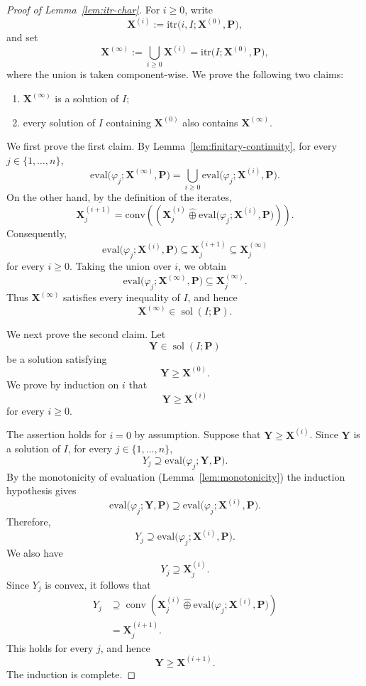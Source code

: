 \documentclass[10pt]{amsart}
\theoremstyle{plain}
\theoremstyle{definition}
\let\geq\geqslant
\providecommand{\cplus}[0]{\ensuremath{\hat{\oplus}}\xspace}
\providecommand{\conv}[1]{\ensuremath{\mathrm{conv}{\left({#1}\right)}\xspace}}
\providecommand{\evalmap}[0]{\ensuremath{\mathrm{eval}}\xspace}
\providecommand{\itr}[0]{\ensuremath{\mathrm{itr}}\xspace}
\begin{document}
\begin{proof}[Proof of Lemma~\ref{lem:itr-char}]

For \(i\geq 0\), write
\[
\mathbf X^{(i)}
:=
\itr
\bigl(i,I;\mathbf X^{(0)},\mathbf P\bigr),
\]
and set
\[
\mathbf X^{(\infty)}
:=
\bigcup_{i\geq 0}\mathbf X^{(i)}
=
\itr
\bigl(I;\mathbf X^{(0)},\mathbf P\bigr),
\]
where the union is taken component-wise. We prove the following two
claims:
\begin{enumerate}
\item
\(\mathbf X^{(\infty)}\) is a solution of \(I\);
\item
every solution of \(I\) containing \(\mathbf X^{(0)}\) also contains
\(\mathbf X^{(\infty)}\).
\end{enumerate}

We first prove the first claim. By Lemma~\ref{lem:finitary-continuity}, for every
\(j\in\{1,\ldots,n\}\),
\[
\evalmap
\bigl(
\varphi_j;\mathbf X^{(\infty)},\mathbf P
\bigr)
=
\bigcup_{i\geq 0}
\evalmap
\bigl(
\varphi_j;\mathbf X^{(i)},\mathbf P
\bigr).
\]
On the other hand, by the definition of the iterates,
\[
\mathbf X^{(i+1)}_j
=\conv{
\left(
\mathbf X^{(i)}_j
\mathbin{\cplus}
\evalmap
\bigl(
\varphi_j;\mathbf X^{(i)},\mathbf P
\bigr)
\right)}.
\]
Consequently,
\[
\evalmap
\bigl(
\varphi_j;\mathbf X^{(i)},\mathbf P
\bigr)
\subseteq
\mathbf X^{(i+1)}_j
\subseteq
\mathbf X^{(\infty)}_j
\]
for every \(i\geq 0\). Taking the union over \(i\), we obtain
\[
\evalmap
\bigl(
\varphi_j;\mathbf X^{(\infty)},\mathbf P
\bigr)
\subseteq
\mathbf X^{(\infty)}_j.
\]
Thus \(\mathbf X^{(\infty)}\) satisfies every inequality of \(I\), and
hence
\[
\mathbf X^{(\infty)}\in\operatorname{sol}(I;\mathbf P).
\]

We next prove the second claim. Let
\[
\mathbf Y\in\operatorname{sol}(I;\mathbf P)
\]
be a solution satisfying
\[
\mathbf Y\geq \mathbf X^{(0)}.
\]
We prove by induction on \(i\) that
\[
\mathbf Y\geq \mathbf X^{(i)}
\]
for every \(i\geq 0\).

The assertion holds for \(i=0\) by assumption. Suppose that
\(\mathbf Y\geq\mathbf X^{(i)}\). Since \(\mathbf Y\) is a solution of
\(I\), for every \(j\in\{1,\ldots,n\}\),
\[
Y_j
\supseteq
\evalmap
\bigl(
\varphi_j;\mathbf Y,\mathbf P
\bigr).
\]
By the monotonicity of evaluation (Lemma~\ref{lem:monotonicity}) the
induction hypothesis gives
\[
\evalmap
\bigl(
\varphi_j;\mathbf Y,\mathbf P
\bigr)
\supseteq
\evalmap
\bigl(
\varphi_j;\mathbf X^{(i)},\mathbf P
\bigr).
\]
Therefore,
\[
Y_j
\supseteq
\evalmap
\bigl(
\varphi_j;\mathbf X^{(i)},\mathbf P
\bigr).
\]
We also have
\[
Y_j\supseteq \mathbf X^{(i)}_j.
\]
Since \(Y_j\) is convex, it follows that
\[
\begin{aligned}
Y_j
&\supseteq
\operatorname{conv}
\left(
\mathbf X^{(i)}_j
\mathbin{\cplus}
\evalmap
\bigl(
\varphi_j;\mathbf X^{(i)},\mathbf P
\bigr)
\right) \\
&=
\mathbf X^{(i+1)}_j.
\end{aligned}
\]
This holds for every \(j\), and hence
\[
\mathbf Y\geq \mathbf X^{(i+1)}.
\]
The induction is complete.


\end{proof}
\end{document}
